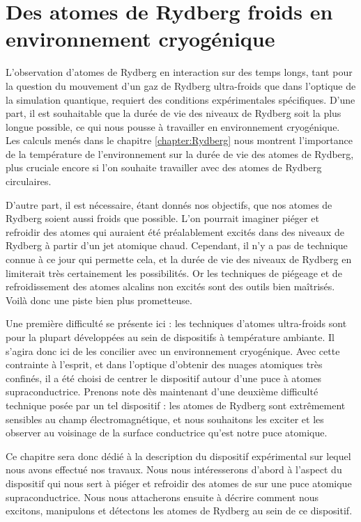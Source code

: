 \chapter{Des atomes de Rydberg froids en environnement cryogénique}
\label{chapter:setup_coldatoms_Rydberg}
%
\vfill
\minitoc
\newpage

\noindent L'observation d'atomes de Rydberg en interaction sur des temps longs, tant pour la question du mouvement d'un gaz de Rydberg ultra-froids que dans l'optique de la simulation quantique, requiert des conditions expérimentales spécifiques.
D'une part, il est souhaitable que la durée de vie des niveaux de Rydberg soit la plus longue possible, ce qui nous pousse à travailler en environnement cryogénique.
Les calculs menés dans le chapitre \ref{chapter:Rydberg} nous montrent l'importance de la température de l'environnement sur la durée de vie des atomes de Rydberg, plus cruciale encore si l'on souhaite travailler avec des atomes de Rydberg circulaires.

D'autre part, il est nécessaire, étant donnés nos objectifs, que nos atomes de Rydberg soient aussi froids que possible.
L'on pourrait imaginer piéger et refroidir des atomes qui auraient été préalablement excités dans des niveaux de Rydberg à partir d'un jet atomique chaud.
Cependant, il n'y a pas de technique connue à ce jour qui permette cela, et la durée de vie des niveaux de Rydberg en limiterait très certainement les possibilités.
Or les techniques de piégeage et de refroidissement des atomes alcalins non excités sont des outils bien maîtrisés.
Voilà donc une piste bien plus prometteuse.

Une première difficulté se présente ici : les techniques d'atomes ultra-froids sont pour la plupart développées au sein de dispositifs à température ambiante.
Il s'agira donc ici de les concilier avec un environnement cryogénique.
Avec cette contrainte à l'esprit, et dans l'optique d'obtenir des nuages atomiques très confinés, il a été choisi de centrer le dispositif autour d'une puce à atomes supraconductrice.
Prenons note dès maintenant d'une deuxième difficulté technique posée par un tel dispositif :
les atomes de Rydberg sont extrêmement sensibles au champ électromagnétique, et nous souhaitons les exciter et les observer au voisinage de la surface conductrice qu'est notre puce atomique.

Ce chapitre sera donc dédié à la description du dispositif expérimental sur lequel nous avons effectué nos travaux.
Nous nous intéresserons d'abord à l'aspect du dispositif qui nous sert à piéger et refroidir des atomes de  sur une puce atomique supraconductrice.
Nous nous attacherons ensuite à décrire comment nous excitons, manipulons et détectons les atomes de Rydberg au sein de ce dispositif.

